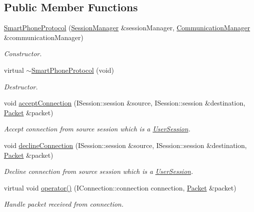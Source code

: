 \subsection*{Public Member Functions}
\begin{DoxyCompactItemize}
\item 
\hyperlink{class_smart_phone_protocol_a788b481331f6a804a2d6a281c50b00cd}{Smart\-Phone\-Protocol} (\hyperlink{class_session_manager}{Session\-Manager} \&session\-Manager, \hyperlink{class_communication_manager}{Communication\-Manager} \&communication\-Manager)
\begin{DoxyCompactList}\small\item\em Constructor. \end{DoxyCompactList}\item 
\hypertarget{class_smart_phone_protocol_a11c3fa7089ca957b0b9e8b771cd39833}{virtual \hyperlink{class_smart_phone_protocol_a11c3fa7089ca957b0b9e8b771cd39833}{$\sim$\-Smart\-Phone\-Protocol} (void)}\label{class_smart_phone_protocol_a11c3fa7089ca957b0b9e8b771cd39833}

\begin{DoxyCompactList}\small\item\em Destructor. \end{DoxyCompactList}\item 
void \hyperlink{class_smart_phone_protocol_a2cd050a068df7af61263e20dfd736bb0}{accept\-Connection} (I\-Session\-::session \&source, I\-Session\-::session \&destination, \hyperlink{class_packet}{Packet} \&packet)
\begin{DoxyCompactList}\small\item\em Accept connection from source session which is a \hyperlink{class_user_session}{User\-Session}. \end{DoxyCompactList}\item 
void \hyperlink{class_smart_phone_protocol_a8d050275f1f224c0d56057330fcfcf2c}{decline\-Connection} (I\-Session\-::session \&source, I\-Session\-::session \&destination, \hyperlink{class_packet}{Packet} \&packet)
\begin{DoxyCompactList}\small\item\em Decline connection from source session which is a \hyperlink{class_user_session}{User\-Session}. \end{DoxyCompactList}\item 
virtual void \hyperlink{class_smart_phone_protocol_ab45cc54c451580109ab2911d81aab978}{operator()} (I\-Connection\-::connection connection, \hyperlink{class_packet}{Packet} \&packet)
\begin{DoxyCompactList}\small\item\em Handle packet received from connection. \end{DoxyCompactList}\end{DoxyCompactItemize}


